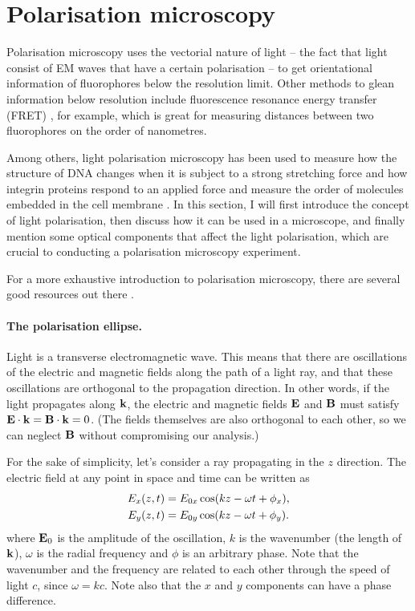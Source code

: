\section{Polarisation microscopy}

Polarisation microscopy uses the vectorial nature of light -- the fact that light consist of EM waves that have a certain polarisation -- to get orientational information of fluorophores below the resolution limit. Other methods to glean information below resolution include fluorescence resonance energy transfer (FRET) \cite{Lerner2021}, for example, which is great for measuring distances between two fluorophores on the order of nanometres.

Among others, light polarisation microscopy has been used to measure how the structure of DNA changes when it is subject to a strong stretching force and how integrin proteins respond to an applied force and measure the order of molecules embedded in the cell membrane \cite{Backer2019, Nordenfelt2017, Swaminathan2017, Brasselet2013}. In this section, I will first introduce the concept of light polarisation, then discuss how it can be used in a microscope, and finally mention some optical components that affect the light polarisation, which are crucial to conducting a polarisation microscopy experiment.

For a more exhaustive introduction to polarisation microscopy, there are several good resources out there \cite{Goldstein2011, Collett2005, Lakowicz2006}.

\paragraph{The polarisation ellipse.} Light is a transverse electromagnetic wave. This means that there are oscillations of the electric and magnetic fields along the path of a light ray, and that these oscillations are orthogonal to the propagation direction. In other words, if the light propagates along $\vb{k}$, the electric and magnetic fields $\vb{E}$ and $\vb{B}$ must satisfy $ \vb{E} \cdot \vb{k} = \vb{B} \cdot \vb{k} = 0$. (The fields themselves are also orthogonal to each other, so we can neglect $ \vb{B} $ without compromising our analysis.)

For the sake of simplicity, let's consider a ray propagating in the $ z $ direction. The electric field at any point in space and time can be written as
\begin{align}
	E_x(z, t) &= E_{0x} \cos(kz-\omega t + \phi_x),\\
	E_y(z, t) &= E_{0y} \cos(kz-\omega t + \phi_y).
\end{align}
where $ \vb{E}_0 $ is the amplitude of the oscillation, $ k $ is the wavenumber (the length of $ \vb{k} $), $ \omega $ is the radial frequency and $ \phi $ is an arbitrary phase. Note that the wavenumber and the frequency are related to each other through the speed of light $ c $, since $ \omega = kc$. Note also that the $ x $ and $ y $ components can have a phase difference.

